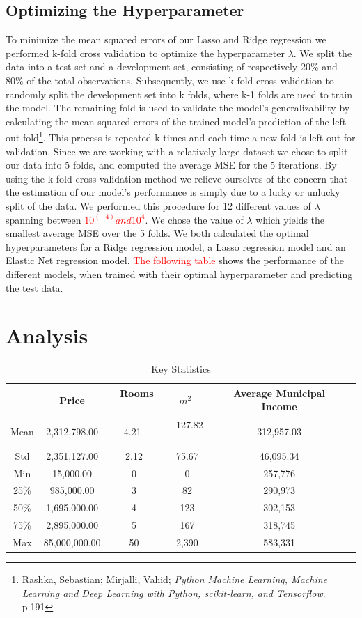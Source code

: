 \documentclass[12pt,a4paper]{article}
\begin{document}
\subsection{Optimizing the Hyperparameter}
To minimize the mean squared errors of our Lasso and Ridge regression we performed k-fold cross validation to optimize the hyperparameter $\lambda$. 
We split the data into a test set and a development set, consisting of respectively 20\% and 80\% of the total observations. Subsequently, we use k-fold cross-validation to randomly split the development set into k folds, where k-1 folds are used to train the model. The remaining fold is used to validate the model’s generalizability by calculating the mean squared errors of the trained model’s prediction of the left-out fold\footnote{Rashka, Sebastian; Mirjalli, Vahid; \textit{Python Machine Learning, Machine Learning and Deep Learning with Python, scikit-learn, and Tensorflow}. p.191}. This process is repeated k times and each time a new fold is left out for validation. Since we are working with a relatively large dataset we chose to split our data into 5 folds, and computed the average MSE for the 5 iterations. By using the k-fold cross-validation method we relieve ourselves of the concern that the estimation of our model’s performance is simply due to a lucky or unlucky split of the data. \newline
We performed this procedure for 12 different values of $\lambda$ spanning between \textcolor{red}{$10^(-4) and 10^4$}. We chose the value of $\lambda$ which yields the smallest average MSE over the 5 folds. 
We both calculated the optimal hyperparameters for a Ridge regression model, a Lasso regression model and an Elastic Net regression model. \textcolor{red}{The following table} shows the performance of the different models, when trained with their optimal hyperparameter and predicting the test data.
\section{Analysis}

\begin{table}[h!]
\begin{center}
\caption{Key Statistics\label{time}}
\begin{tabular}{| c | c | c | c | c | c |} 
\hline
   & Price & \, Rooms \ & \ $m^2$ \ & Average Municipal Income \\ \hline
   Mean & 2,312,798.00 & \ 4.21 \  & \ 127.82 \ & 312,957.03 \\ \hline
   Std & 2,351,127.00 & 2.12 & 75.67 & 46,095.34 \\ \hline
   Min & 15,000.00 & 0 & 0 & 257,776 \\ \hline
   25\% & 985,000.00 & 3 & 82 & 290,973 \\ \hline
   50\% & 1,695,000.00 & 4 & 123 & 302,153 \\ \hline
   75\% & 2,895,000.00 & 5 & 167 & 318,745 \\ \hline
   Max & 85,000,000.00 & 50 & 2,390 & 583,331 \\ \hline
\end{tabular}
\end{center}
\end{table}
\end{document}
